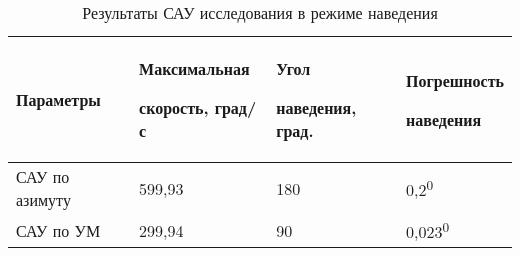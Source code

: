 

\begin{table}[h]
	\centering
	\caption{Результаты САУ исследования в режиме наведения}
	\begin{tabular}{p{1.37in}p{1.47in}p{1.41in}p{1.24in}}
		\hline
		\multicolumn{1}{|p{1.37in}}{Параметры} & 
		\multicolumn{1}{|p{1.47in}}{Максимальная  \par скорость, град/с} & 
		\multicolumn{1}{|p{1.41in}}{Угол \par наведения, град.} & 
		\multicolumn{1}{|p{1.24in}|}{Погрешность \par наведения} \\
		\hline
		\multicolumn{1}{|p{1.37in}}{САУ по азимуту} & 
		\multicolumn{1}{|p{1.47in}}{599,93} & 
		\multicolumn{1}{|p{1.41in}}{180} & 
		\multicolumn{1}{|p{1.24in}|}{0,2\textsuperscript{0}} \\
		\hline
		\multicolumn{1}{|p{1.37in}}{САУ по УМ} & 
		\multicolumn{1}{|p{1.47in}}{299,94} & 
		\multicolumn{1}{|p{1.41in}}{90} & 
		\multicolumn{1}{|p{1.24in}|}{0,023\textsuperscript{0}} \\
		\hline
		
	\end{tabular}
\end{table}






